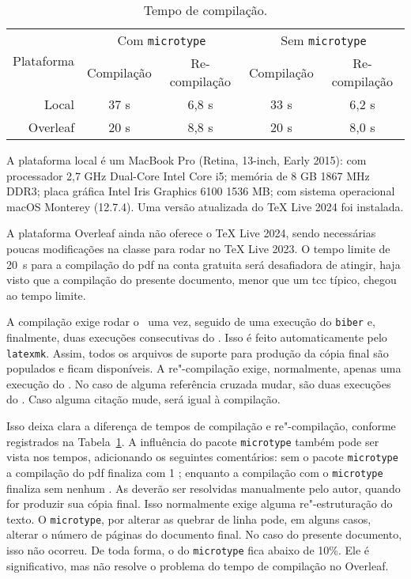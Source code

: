 \begin{table}
	\caption{Tempo de compilação.}
	\label{tab:time}
	\begin{tabular}{r c c c c}\toprule
		\multirow{2}{*}{Plataforma}	&	\multicolumn{2}{c}{Com \texttt{microtype}}	&	\multicolumn{2}{c}{Sem \texttt{microtype}}\\
								&	Compilação	& Re-compilação	& Compilação	& Re-compilação\\\midrule
		Local	&	37 s	&	6,8 s	&	33 s	&	6,2 s\\
		Overleaf	&	20 s	&	8,8 s	&	20 s	&	8,0 s\\\bottomrule
	\end{tabular}
\end{table}

A plataforma local é um MacBook Pro (Retina, 13-inch, Early 2015): com processador 2,7 GHz Dual-Core Intel Core i5; memória de 8 GB 1867 MHz DDR3; placa gráfica Intel Iris Graphics 6100 1536 MB; com sistema operacional macOS Monterey (12.7.4). Uma versão atualizada do TeX Live 2024 foi instalada.

A plataforma Overleaf ainda não oferece o TeX Live 2024, sendo necessárias poucas modificações na classe para rodar no TeX Live 2023. O tempo limite de 20~s para a compilação do \ac{pdf} na conta gratuita será desafiadora de atingir, haja visto que a compilação do presente documento, menor que um \ac{tcc} típico, chegou ao tempo limite.

A compilação exige rodar o \pdflatex\ uma vez, seguido de uma execução do \texttt{biber} e, finalmente, duas execuções consecutivas do \pdflatex. Isso é feito automaticamente pelo \texttt{latexmk}. Assim, todos os arquivos de suporte para produção da cópia final são populados e ficam disponíveis. A re"-compilação exige, normalmente, apenas uma execução do \pdflatex. No caso de alguma referência cruzada mudar, são duas execuções do \pdflatex. Caso alguma citação mude, será igual à compilação.

Isso deixa clara a diferença de tempos de compilação e re"-compilação, conforme registrados na Tabela~\ref{tab:time}. A influência do pacote \texttt{microtype} também pode ser vista nos tempos, adicionando os seguintes comentários: sem o pacote \texttt{microtype} a compilação do \ac{pdf} finaliza com 1 ; enquanto a compilação com o \texttt{microtype} finaliza sem nenhum . As  deverão ser resolvidas manualmente pelo autor, quando for produzir sua cópia final. Isso normalmente exige alguma re"-estruturação do texto. O \texttt{microtype}, por alterar as quebrar de linha pode, em alguns casos, alterar o número de páginas do documento final. No caso do presente documento, isso não ocorreu. De toda forma, o  do \texttt{microtype} fica abaixo de 10\%. Ele é significativo, mas não resolve o problema do tempo de compilação no Overleaf.

